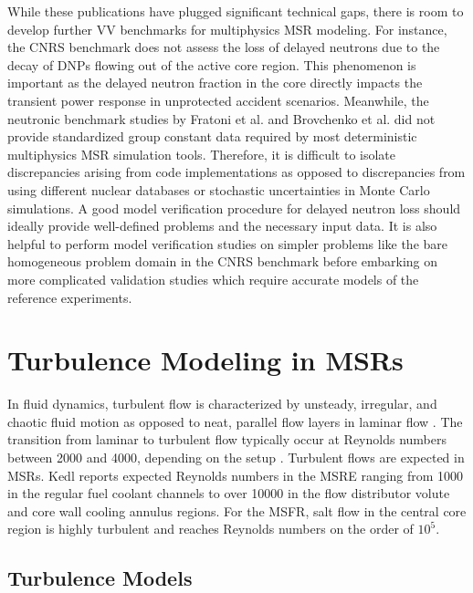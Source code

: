While these publications have plugged significant technical gaps, there is room to develop further
\gls{VV} benchmarks for multiphysics \gls{MSR} modeling. For instance, the
CNRS benchmark does not assess the loss of delayed neutrons due to the decay of \glspl{DNP} flowing
out of the active core region. This phenomenon is important as the delayed neutron fraction in the
core directly impacts the transient power response in unprotected accident scenarios. Meanwhile,
the neutronic benchmark studies by Fratoni et al. \cite{fratoni_molten_2020} and Brovchenko et al.
\cite{brovchenko_neutronic_2019} did not provide standardized group constant data required by most
deterministic multiphysics \gls{MSR} simulation tools. Therefore, it is difficult to isolate
discrepancies arising from code implementations as opposed to discrepancies from using different
nuclear databases or stochastic uncertainties in Monte Carlo simulations. A good model verification
procedure for delayed neutron loss should ideally provide well-defined problems and the necessary
input data. It is also helpful to perform model verification studies on simpler problems like the
bare homogeneous problem domain in the CNRS benchmark before embarking on more complicated
validation studies which require accurate models of the reference experiments.

\section{Turbulence Modeling in MSRs}

In fluid dynamics, turbulent flow is characterized by unsteady, irregular, and
chaotic fluid motion as opposed to neat, parallel flow layers in laminar flow
\cite{pope_turbulent_2000}. The transition from laminar to turbulent flow
typically occur at Reynolds numbers between 2000 and 4000, depending on the
setup \cite{pope_turbulent_2000}. Turbulent flows are expected in \glspl{MSR}.
Kedl \cite{kedl_fluid_1970} reports expected Reynolds numbers in the \gls{MSRE}
ranging from 1000 in the regular fuel coolant channels to over 10000 in the
flow distributor volute and core wall cooling annulus regions. For the
\gls{MSFR}, salt flow in the central core region is highly turbulent and
reaches Reynolds numbers on the order of $10^5$.

\subsection{Turbulence Models}

